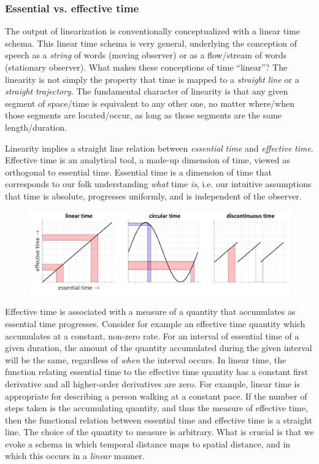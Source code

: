 \subsubsection{Essential vs. effective time}

The output of linearization is conventionally conceptualized with a linear time schema. This linear time schema is very general, underlying the conception of speech as a \textit{string} of words (moving observer) or as a flow/stream of words (stationary observer). What makes these conceptions of time “linear”?  The linearity is not simply the property that time is mapped to a \textit{straight} \textit{line} or a \textit{straight} \textit{trajectory}. The fundamental character of linearity is that any given segment of space/time is equivalent to any other one, no matter where/when those segments are located/occur, as long as those segments are the same length/duration. 

  Linearity implies a straight line relation between \textit{essential} \textit{time} and \textit{effective} \textit{time}. Effective time is an analytical tool, a made-up dimension of time, viewed as orthogonal to essential time. Essential time is a dimension of time that corresponds to our folk understanding \textit{what} time \textit{is}, i.e. our intuitive assumptions that time is absolute, progresses uniformly, and is independent of the observer.

  
\begin{figure}
\includegraphics[width=\textwidth]{figures/Tilsen-img45.png}
\caption{\missingcaption}
\label{fig:}
\end{figure}
 

  Effective time is associated with a measure of a quantity that accumulates as essential time progresses. Consider for example an effective time quantity which accumulates at a constant, non-zero rate. For an interval of essential time of a given duration, the amount of the quantity accumulated during the given interval will be the same, regardless of \textit{when} the interval occurs. In linear time, the function relating essential time to the effective time quantity has a constant first derivative and all higher-order derivatives are zero. For example, linear time is appropriate for describing a person walking at a constant pace. If the number of steps taken is the accumulating quantity, and thus the measure of effective time, then the functional relation between essential time and effective time is a straight line. The choice of the quantity to measure is arbitrary. What is crucial is that we evoke a schema in which temporal distance maps to spatial distance, and in which this occurs in a \textit{linear} manner.

